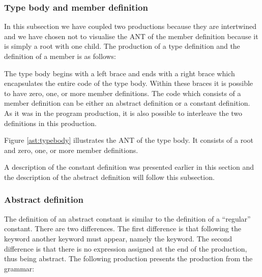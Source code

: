 \subsubsection{Type body and member definition}

In this subsection we have coupled two productions because they are intertwined
and we have chosen not to visualise the ANT of the member definition because it
is simply a root with one child. The production of a type definition and the
definition of a member is as follows:

\begin{ebnf}
\end{ebnf}

The type body begins with a left brace and ends with a right brace which
encapsulates the entire code of the type body. Within these braces it is
possible to have zero, one, or more member definitions. The code which consists
of a member definition can be either an abstract definition or a constant
definition. As it was in the program production, it is also possible to
interleave the two definitions in this production.



Figure \ref{ast:typebody} illustrates the ANT of the type body. It consists of a
root and zero, one, or more member definitions.

A description of the constant definition was presented earlier in this section
and the description of the abstract definition will follow this subsection.

\subsubsection{Abstract definition}
The definition of an abstract constant is similar to the definition of a
``regular'' constant. There are two differences. The first difference is that
following the  keyword another keyword must appear, namely the
 keyword. The second difference is that there is no expression
assigned at the end of the production, thus being abstract. The following
production presents the production from the grammar:

\begin{ebnf}
\end{ebnf}

